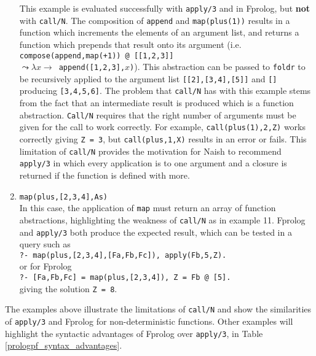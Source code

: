 \documentclass[a4paper,11pt,twoside]{article}
\begin{document}
\begin{enumerate}
{  This example is evaluated successfully with \texttt{apply/3} and in Fprolog,
  but \textbf{not} with \texttt{call/N}.  The composition of \texttt{append} and
  \texttt{map(plus(1))} results in a function which increments the elements of an
  argument list, and returns a function which prepends that result onto its
  argument (i.e. \texttt{compose(append,map(+1)) @ [[1,2,3]]} \\
  \mbox{$\leadsto \lambda x \rightarrow$ \texttt{append([1,2,3],$x$)}}).  This abstraction
  can be passed to \texttt{foldr} to be recursively applied to the argument list
  \texttt{[[2],[3,4],[5]]} and \texttt{[]} producing \texttt{[3,4,5,6]}.
  The problem that \texttt{call/N} has with this example stems from the fact that
  an intermediate result is produced which is a function abstraction.
  \texttt{Call/N} requires that the right number of arguments must be given for the
  call to work correctly.  For example, \texttt{call(plus(1),2,Z)} works correctly
  giving \texttt{Z = 3}, but \texttt{call(plus,1,X)} results in an error or fails.
  This limitation of \texttt{call/N} provides the motivation for Naish \cite{Nai96}
  to recommend \texttt{apply/3} in which every application is to one argument and
  a closure is returned if the function is defined with more.}
\item{\texttt{map(plus,[2,3,4],As)}\\
  In this case, the application of \texttt{map} must return an array of
  function abstractions, highlighting the weakness of \texttt{call/N} as in example
  11.  Fprolog and \texttt{apply/3} both produce the expected result, which can be tested 
  in a query such as\\
  \mbox{\texttt{?- map(plus,[2,3,4],[Fa,Fb,Fc]), apply(Fb,5,Z).}}\\ or for Fprolog\\
  \mbox{\texttt{?- [Fa,Fb,Fc] = map(plus,[2,3,4]), Z = Fb @ [5].}}\\ giving the
  solution \mbox{\texttt{Z = 8}}.}
\end{enumerate}

The examples above illustrate the limitations of \texttt{call/N} and show the similarities
of \texttt{apply/3} and Fprolog for non-deterministic functions.  Other examples will highlight
the syntactic advantages of Fprolog over \texttt{apply/3}, in
Table \ref{prologpf_syntax_advantages}.
\end{document}
